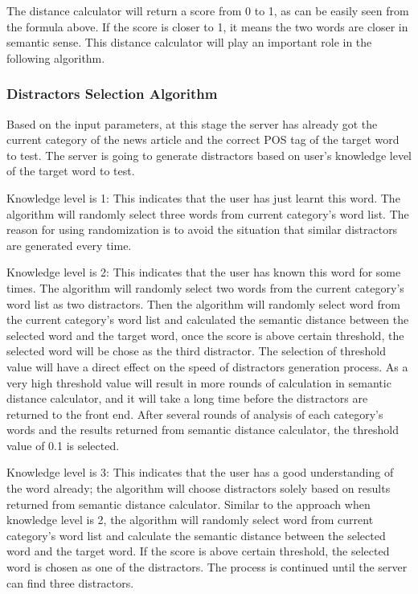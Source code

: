 The distance calculator will return a score from 0 to 1, as can be easily seen from the formula above. If the score is closer to 1, it means the two words are closer in semantic sense. This distance calculator will play an important role in the following algorithm. 

\subsubsection{Distractors Selection Algorithm}
Based on the input parameters, at this stage the server has already got the current category of the news article and the correct POS tag of the target word to test. The server is going to generate distractors based on user’s knowledge level of the target word to test.

Knowledge level is 1: This indicates that the user has just learnt this word. The algorithm will randomly select three words from current category’s word list. The reason for using randomization is to avoid the situation that similar distractors are generated every time.

Knowledge level is 2: This indicates that the user has known this word for some times. The algorithm will randomly select two words from the current category’s word list as two distractors. Then the algorithm will randomly select word from the current category’s word list and calculated the semantic distance between the selected word and the target word, once the score is above certain threshold, the selected word will be chose as the third distractor. The selection of threshold value will have a direct effect on the speed of distractors generation process. As a very high threshold value will result in more rounds of calculation in semantic distance calculator, and it will take a long time before the distractors are returned to the front end. After several rounds of analysis of each category’s words and the results returned from semantic distance calculator, the threshold value of 0.1 is selected.

Knowledge level is 3: This indicates that the user has a good understanding of the word already; the algorithm will choose distractors solely based on results returned from semantic distance calculator. Similar to the approach when knowledge level is 2, the algorithm will randomly select word from current category’s word list and calculate the semantic distance between the selected word and the target word. If the score is above certain threshold, the selected word is chosen as one of the distractors. The process is continued until the server can find three distractors. 


